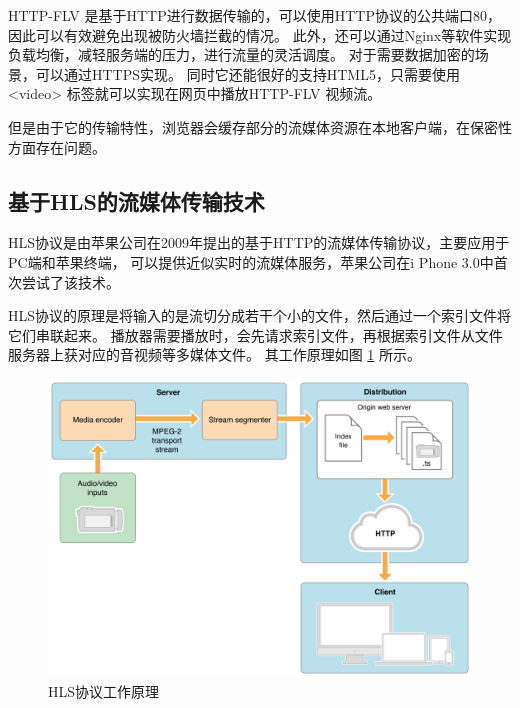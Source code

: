 HTTP-FLV 是基于HTTP进行数据传输的，可以使用HTTP协议的公共端口80，
因此可以有效避免出现被防火墙拦截的情况。
此外，还可以通过Nginx等软件实现负载均衡，减轻服务端的压力，进行流量的灵活调度。
对于需要数据加密的场景，可以通过HTTPS实现。
同时它还能很好的支持HTML5，只需要使用 <video> 标签就可以实现在网页中播放HTTP-FLV 视频流。

但是由于它的传输特性，浏览器会缓存部分的流媒体资源在本地客户端，在保密性方面存在问题。



\subsection{基于HLS的流媒体传输技术}
HLS协议是由苹果公司在2009年提出的基于HTTP的流媒体传输协议，主要应用于PC端和苹果终端，
可以提供近似实时的流媒体服务，苹果公司在i Phone 3.0中首次尝试了该技术\cite{魏雪飞2020HLS}。

HLS协议的原理是将输入的是流切分成若干个小的文件，然后通过一个索引文件将它们串联起来。
播放器需要播放时，会先请求索引文件，再根据索引文件从文件服务器上获对应的音视频等多媒体文件。
其工作原理如图 \ref{Fig:hls} 所示。

\begin{figure}[ht]
    \centering
    \includegraphics[width=0.8\linewidth]{./Figure/IMG_hls.png}
    \caption{HLS协议工作原理}
    \label{Fig:hls}
\end{figure}

